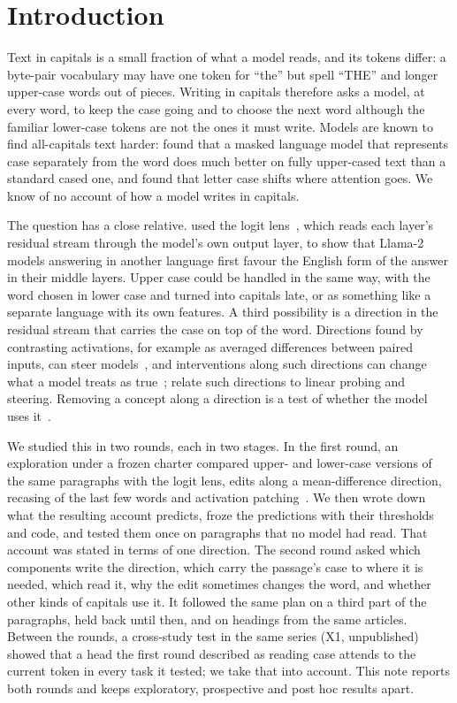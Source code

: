 \documentclass[11pt]{article}
\begin{document}
\section{Introduction}
\label{sec:intro}

Text in capitals is a small fraction of what a model reads, and its tokens differ: a byte-pair vocabulary may have one token for ``the'' but spell ``THE'' and longer upper-case words out of pieces. Writing in capitals therefore asks a model, at every word, to keep the case going and to choose the next word although the familiar lower-case tokens are not the ones it must write. Models are known to find all-capitals text harder: \citet{powalski2020unicase} found that a masked language model that represents case separately from the word does much better on fully upper-cased text than a standard cased one, and \citet{dillitzer2026casing} found that letter case shifts where attention goes. We know of no account of how a model writes in capitals.

The question has a close relative. \citet{wendler2024llamas} used the logit lens~\citep{nostalgebraist2020logitlens}, which reads each layer's residual stream through the model's own output layer, to show that Llama-2 models answering in another language first favour the English form of the answer in their middle layers. Upper case could be handled in the same way, with the word chosen in lower case and turned into capitals late, or as something like a separate language with its own features. A third possibility is a direction in the residual stream that carries the case on top of the word. Directions found by contrasting activations, for example as averaged differences between paired inputs, can steer models~\citep{turner2023steering,panickssery2023caa}, and interventions along such directions can change what a model treats as true~\citep{marks2023geometry}; \citet{park2023linear} relate such directions to linear probing and steering. Removing a concept along a direction is a test of whether the model uses it~\citep{belrose2023leace}.

We studied this in two rounds, each in two stages. In the first round, an exploration under a frozen charter compared upper- and lower-case versions of the same paragraphs with the logit lens, edits along a mean-difference direction, recasing of the last few words and activation patching~\citep{meng2022locating,heimersheim2024patching,zhang2024patching}. We then wrote down what the resulting account predicts, froze the predictions with their thresholds and code, and tested them once on paragraphs that no model had read. That account was stated in terms of one direction. The second round asked which components write the direction, which carry the passage's case to where it is needed, which read it, why the edit sometimes changes the word, and whether other kinds of capitals use it. It followed the same plan on a third part of the paragraphs, held back until then, and on headings from the same articles. Between the rounds, a cross-study test in the same series (X1, unpublished) showed that a head the first round described as reading case attends to the current token in every task it tested; we take that into account. This note reports both rounds and keeps exploratory, prospective and post hoc results apart.
\end{document}
